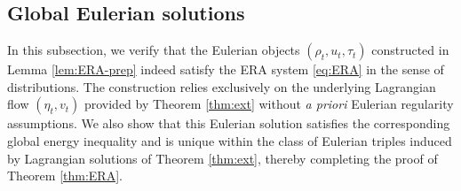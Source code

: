 \documentclass[10pt,reqno]{amsart}
\numberwithin{equation}{section}
\begin{document}
%
%
%                      
%
%
 

\subsection{Global Eulerian solutions}

In this subsection, we verify that the Eulerian objects $(\rho_t,u_t,\tau_t)$ constructed in Lemma \ref{lem:ERA-prep} indeed satisfy the ERA system \eqref{eq:ERA} in the sense of distributions.
The construction relies exclusively on the underlying Lagrangian flow $(\eta_t,v_t)$ provided by Theorem \ref{thm:ext} without \emph{a priori} Eulerian regularity assumptions. We also show that this Eulerian solution satisfies the corresponding global energy inequality and is unique within the class of Eulerian triples induced by Lagrangian solutions of Theorem \ref{thm:ext}, thereby completing the proof of Theorem \ref{thm:ERA}.
 
\end{document}
